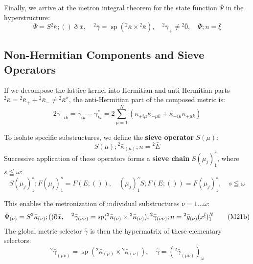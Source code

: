 \documentclass[11pt,a4paper,oneside]{article}
\DeclareMathOperator{\spn}{sp}
\newcommand{\ethop}{\eth}
\begin{document}
Finally, we arrive at the metron integral theorem for the state function $\bar{\Psi}$ in the hyperstructure:
\begin{equation}
    \bar{\Psi}=S{}^2 \bar{\kappa}; () \ethop\bar{x},\quad{}^2 \bar{\gamma}=\spn({}^2 \bar{\kappa} \times {}^2 \bar{\kappa} ),\quad {}^2 \bar{\gamma}_+\neq {}^2 \bar{0},\quad \bar{\Psi };n=\bar{\xi } \tag{M21}
\end{equation}

\subsection{Non-Hermitian Components and Sieve Operators}

If we decompose the lattice kernel into Hermitian and anti-Hermitian parts ${}^2 \bar{\kappa} = {}^2 \bar{\kappa}_+ + {}^2 \bar{\kappa}_- \neq {}^2 \bar{\kappa}^x$, the anti-Hermitian part of the composed metric is:
\begin{equation*}
    2\gamma_{-ik} = \gamma_{ik} - \gamma_{ki}^* = 2 \sum_{\mu=1}^N (\kappa_{+i\mu} \kappa_{-\mu k} + \kappa_{-i\mu} \kappa_{+\mu k})
\end{equation*}

To isolate specific substructures, we define the \textbf{sieve operator} $S(\mu)$:
\begin{equation*}
    S(\mu); {}^2 \bar{\kappa}_{(\mu)}; n = {}^2 \bar{E}
\end{equation*}
Successive application of these operators forms a \textbf{sieve chain} $S(\mu_j)_1^s$, where $s \leqq \omega$:
\begin{equation}
    S(\mu_j)_1^s; F ( \mu_j)_1^s=F (E; ()),\quad ( \mu_j)_1^sS; F(E;()) = F(\mu_j)_1^s, \quad s\leqq \omega \tag{M21a}
\end{equation}

This enables the metronization of individual substructures $\nu = 1 \dots \omega$:
\begin{equation}
    \bar{\Psi }_{(\nu)}=S{}^2 \bar{\kappa}_{(\nu)}; ()\ethop\bar{x},\quad {}^2\bar{\gamma}_{(\nu\nu)}= \spn( {}^2 \bar{\kappa}_{(\nu)}\times {}^2\bar{\kappa}_{(\nu)}),\\ {}^2 \bar{\gamma}_{(\nu\nu)} ;n={}^2\bar{g}_{(\nu)}(x^{\underline{l}})_1^N \tag{M21b}
\end{equation}
The global metric selector $\hat{\gamma}$ is then the hypermatrix of these elementary selectors:
\begin{equation}
    {}^2 \bar{\gamma}_{(\mu\nu)} = \spn( {}^2 \bar{\kappa}_{(\mu)}\times {}^2\bar {\kappa}_{(\nu)}),\quad \hat{\gamma}=( {}^2 \bar{\gamma}_{(\mu\nu)})_\omega \tag{M22}
\end{equation}
\end{document}
